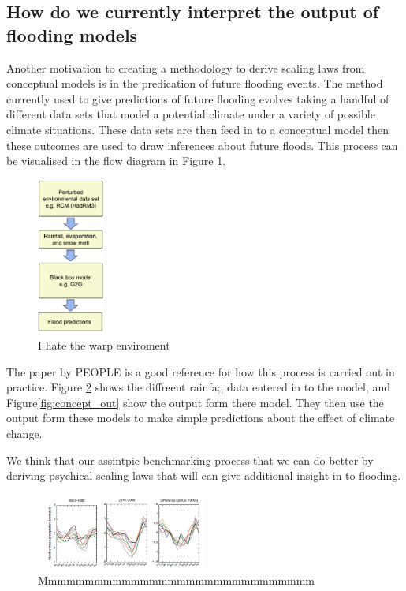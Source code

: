 \documentclass[11pt]{article}
\begin{document}
\subsection{How do we currently interpret the output of flooding models}
Another motivation to creating a methodology to derive scaling laws from conceptual models is in the predication of future flooding events. The method currently used to give predictions of future flooding evolves taking a handful of different data sets that model a potential climate under a variety of possible climate situations. These data sets are then feed in to a conceptual model then these outcomes are used to draw inferences about future floods.
This process can be visualised in the flow diagram in Figure \ref{fig:flow}.

\begin{figure}[H]%
    \centering
    \includegraphics[width=0.2\textwidth]{Figs/flow.png}
    \caption{I hate the warp enviroment}
    \label{fig:flow}
\end{figure}

The paper by PEOPLE is a good reference for how this process is carried out in practice. Figure \ref{fig:concept_in} shows the diffreent rainfa;; data entered in to the model, and Figure\ref{fig:concept_out} show the output form there model. They then use the output form these models to make simple predictions about the effect of climate change.

We think that our assintpic benchmarking process that we can do better by deriving psychical scaling laws that will can give additional insight in to flooding.

\begin{figure}[H]%
    \centering
    \includegraphics[width=0.5\textwidth]{Figs/concept_in.jpg}
    \caption{Mmmmmmmmmmmmmmmmmmmmmmmmmmmmmm}
    \label{fig:concept_in}
\end{figure}
\end{document}
